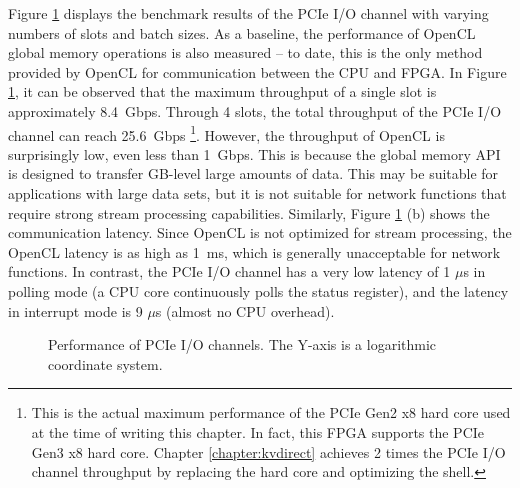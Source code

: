 Figure \ref {clicknp:fig:pcie} displays the benchmark results of the PCIe I/O channel with varying numbers of slots and batch sizes. As a baseline, the performance of OpenCL global memory operations is also measured -- to date, this is the only method provided by OpenCL \cite {opencl} for communication between the CPU and FPGA. In Figure \ref {clicknp:fig:pcie}, it can be observed that the maximum throughput of a single slot is approximately 8.4~Gbps. Through 4 slots, the total throughput of the PCIe I/O channel can reach 25.6~Gbps \footnote{This is the actual maximum performance of the PCIe Gen2 x8 hard core used at the time of writing this chapter. In fact, this FPGA supports the PCIe Gen3 x8 hard core. Chapter \ref{chapter:kvdirect} achieves 2 times the PCIe I/O channel throughput by replacing the hard core and optimizing the shell.}. However, the throughput of OpenCL is surprisingly low, even less than 1~Gbps. This is because the global memory API is designed to transfer GB-level large amounts of data. This may be suitable for applications with large data sets, but it is not suitable for network functions that require strong stream processing capabilities. Similarly, Figure \ref {clicknp:fig:pcie} (b) shows the communication latency. Since OpenCL is not optimized for stream processing, the OpenCL latency is as high as 1~ms, which is generally unacceptable for network functions. In contrast, the PCIe I/O channel has a very low latency of 1 $\mu$s in polling mode (a CPU core continuously polls the status register), and the latency in interrupt mode is 9 $\mu$s (almost no CPU overhead).

\begin{figure}[htbp]
	\centering

	\caption{Performance of PCIe I/O channels. The Y-axis is a logarithmic coordinate system.}

	\label{clicknp:fig:pcie}
\end{figure}

